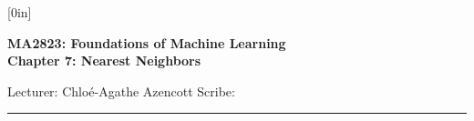 \documentclass[a4paper,12pt]{article}
\begin{document}
\raisebox{0.6in}[0in]{}
\vspace{-0.7in}

\begin{center}
\bf\large MA2823: Foundations of Machine Learning \\
Chapter 7: Nearest Neighbors
\end{center}

\noindent
Lecturer: Chlo\'e-Agathe Azencott   
\hfill
Scribe: 

\noindent
\rule{\textwidth}{1pt}

\medskip

\end{document}
